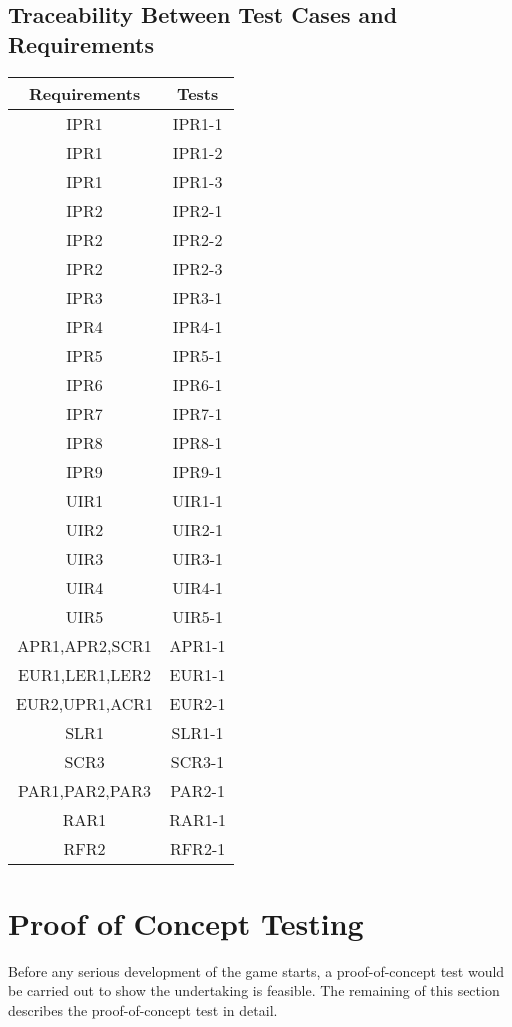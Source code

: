 \documentclass[12pt, titlepage]{article}
\begin{document}
\subsection{Traceability Between Test Cases and Requirements}
\begin{center}
    \begin{tabular}{||c | c ||}
    \hline
    Requirements & Tests\\
    \hline
    IPR1&IPR1-1\\
    \hline
    IPR1&IPR1-2\\
    \hline
    IPR1&IPR1-3\\
    \hline
    IPR2&IPR2-1\\
    \hline
    IPR2&IPR2-2\\
    \hline
    IPR2&IPR2-3\\
    \hline
    IPR3&IPR3-1\\
    \hline
    IPR4&IPR4-1\\
    \hline
    IPR5&IPR5-1\\
    \hline
    IPR6&IPR6-1\\
    \hline
    IPR7&IPR7-1\\
    \hline
    IPR8&IPR8-1\\
    \hline
    IPR9&IPR9-1\\
    \hline
    UIR1&UIR1-1\\
    \hline
    UIR2&UIR2-1\\
    \hline
    UIR3&UIR3-1\\
    \hline
    UIR4&UIR4-1\\
    \hline
    UIR5&UIR5-1\\
    \hline
    APR1,APR2,SCR1 & APR1-1\\
    \hline
    EUR1,LER1,LER2 & EUR1-1\\
    \hline
    EUR2,UPR1,ACR1 & EUR2-1\\
    \hline
    SLR1 & SLR1-1\\
    \hline
    SCR3 & SCR3-1\\
    \hline
    PAR1,PAR2,PAR3 & PAR2-1\\
    \hline
    RAR1 & RAR1-1\\
    \hline
    RFR2 & RFR2-1\\
    \hline
    \end{tabular}
    
\end{center}

\section{Proof of Concept Testing}
Before any serious development of the game starts, a proof-of-concept test would be carried out to show the undertaking is feasible. The remaining of this section describes the proof-of-concept test in detail.
\end{document}
